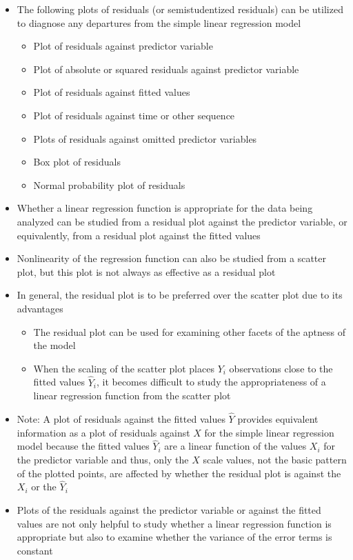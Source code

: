 \begin{itemize}
\item The following plots of residuals (or semistudentized residuals) can be utilized to diagnose any departures from the simple linear regression model \begin{itemize} 
\item Plot of residuals against predictor variable
\item Plot of absolute or squared residuals against predictor variable 
\item Plot of residuals against fitted values 
\item Plot of residuals against time or other sequence 
\item Plots of residuals against omitted predictor variables 
\item Box plot of residuals 
\item Normal probability plot of residuals \end{itemize} 
\item Whether a linear regression function is appropriate for the data being analyzed can be studied from a residual plot against the predictor variable, or equivalently, from a residual plot against the fitted values 
\item Nonlinearity of the regression function can also be studied from a scatter plot, but this plot is not always as effective as a residual plot 
\item In general, the residual plot is to be preferred over the scatter plot due to its advantages \begin{itemize} 
\item The residual plot can be used for examining other facets of the aptness of the model 
\item When the scaling of the scatter plot places $Y_i$ observations close to the fitted values $\hat{Y}_i$, it becomes difficult to study the appropriateness of a linear regression function from the scatter plot \end{itemize} 
\item Note: A plot of residuals against the fitted values $\hat{Y}$ provides equivalent information as a plot of residuals against $X$ for the simple linear regression model because the fitted values $\hat{Y}_i$ are a linear function of the values $X_i$ for the predictor variable and thus, only the $X$ scale values, not the basic pattern of the plotted points, are affected by whether the residual plot is against the $X_i$ or the $\hat{Y}_i$  
\item Plots of the residuals against the predictor variable or against the fitted values are not only helpful to study whether a linear regression function is appropriate but also to examine whether the variance of the error terms is constant 

\end{itemize}
